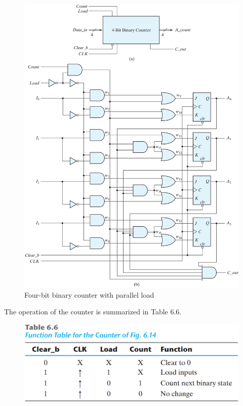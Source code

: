 \begin{figure}[H]
  \centering
  \includegraphics[width=\linewidth]{img/fig-6.14.png}
  \caption{Four-bit binary counter with parallel load}
  \label{fig:6.14}
\end{figure}

\noindent The operation of the counter is summarized in Table 6.6.

\begin{figure}[H]
  \centering
  \includegraphics[width=\linewidth]{img/table-6.6.png}
  \label{table:6.6}
\end{figure}

